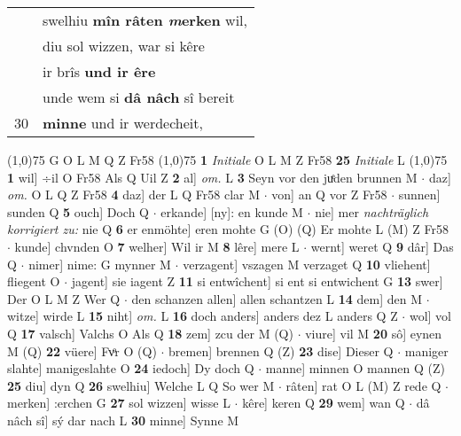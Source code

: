 \documentclass[8pt,a4paper,notitlepage]{article}
\begin{document}
\begin{table}[ht]
\begin{minipage}[t]{0.5\linewidth}
\begin{tabular}{rl}
 & swelhiu \textbf{mîn râten \textit{m}erken} wil,\\ 
 & diu sol wizzen, war si kêre\\ 
 & ir brîs \textbf{und ir êre}\\ 
 & unde wem si \textbf{dâ nâch} sî bereit\\ 
30 & \textbf{minne} und ir werdecheit,\\ 
\end{tabular}
\scriptsize
\line(1,0){75} \newline
G O L M Q Z Fr58 \newline
\line(1,0){75} \newline
\textbf{1} \textit{Initiale} O L M Z Fr58  \textbf{25} \textit{Initiale} L  \newline
\line(1,0){75} \newline
\textbf{1} wil] ÷il O Fr58 Als Q Uil Z \textbf{2} al] \textit{om.} L \textbf{3} Seyn vor den juͤden brunnen M  $\cdot$ daz] \textit{om.} O L Q Z Fr58 \textbf{4} daz] der L Q Fr58 clar M  $\cdot$ von] an Q vor Z Fr58  $\cdot$ sunnen] sunden Q \textbf{5} ouch] Doch Q  $\cdot$ erkande] [ny]: en kunde M  $\cdot$ nie] mer \textit{nachträglich korrigiert zu:} nie Q \textbf{6} er enmöhte] eren mohte G (O) (Q) Er mohte L (M) Z Fr58  $\cdot$ kunde] chvnden O \textbf{7} welher] Wil ir M \textbf{8} lêre] mere L  $\cdot$ wernt] weret Q \textbf{9} dâr] Das Q  $\cdot$ nimer] nime: G mynner M  $\cdot$ verzagent] vszagen M verzaget Q \textbf{10} vliehent] fliegent O  $\cdot$ jagent] sie iagent Z \textbf{11} si entwîchent] si ent si entwichent G \textbf{13} swer] Der O L M Z Wer Q  $\cdot$ den schanzen allen] allen schantzen L \textbf{14} dem] den M  $\cdot$ witze] wirde L \textbf{15} niht] \textit{om.} L \textbf{16} doch anders] anders dez L anders Q Z  $\cdot$ wol] vol Q \textbf{17} valsch] Valchs O Als Q \textbf{18} zem] zcu der M (Q)  $\cdot$ viure] vil M \textbf{20} sô] eynen M (Q) \textbf{22} vüere] Fvͦr O (Q)  $\cdot$ bremen] brennen Q (Z) \textbf{23} dise] Dieser Q  $\cdot$ maniger slahte] manigeslahte O \textbf{24} iedoch] Dy doch Q  $\cdot$ manne] minnen O mannen Q (Z) \textbf{25} diu] dyn Q \textbf{26} swelhiu] Welche L Q So wer M  $\cdot$ râten] rat O L (M) Z rede Q  $\cdot$ merken] :erchen G \textbf{27} sol wizzen] wisse L  $\cdot$ kêre] keren Q \textbf{29} wem] wan Q  $\cdot$ dâ nâch sî] sý dar nach L \textbf{30} minne] Synne M \newline
\end{minipage}
\hspace{0.5cm}
\begin{minipage}[t]{0.5\linewidth}

\end{minipage}
\end{table}
\end{document}
